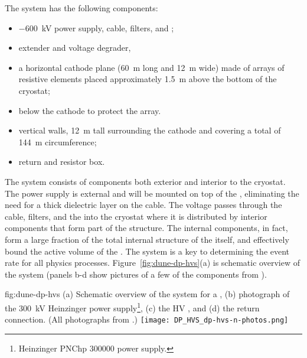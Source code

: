 The \dual {} system has the following components:

\begin{itemize}
\item \SI{-600}{kV}  power supply, cable, filters, and \fdth;
\item {} extender and voltage degrader,
\item a horizontal cathode plane (\SI{60}{\m} long and \SI{12}{\m} wide) made of arrays of resistive elements placed approximately \SI{1.5}{\m} above the bottom of the cryostat;
\item {} below the cathode to protect the  array.
\item vertical  walls, \SI{12}{\m} tall surrounding the cathode and covering a total of \SI{144}{\m} circumference;
\item {} return \fdth and resistor box.
\end{itemize}

The  system consists of components both exterior and interior to the cryostat. The  power supply is external and will be mounted on top of the  \fdth, eliminating the need for a thick dielectric layer on the  cable. 
The voltage passes through the cable, filters, and the \fdth into the cryostat where it is distributed by interior components that form part of the  structure.  The internal  components, in fact, form a large fraction of the total internal structure of the  itself, and  
 effectively bound the active volume of the . The  system is a key to determining the event rate for all  physics processes. 
 Figure~\ref{fig:dune-dp-hvs}(a) is schematic overview of the  system (panels b-d show pictures of a few of the components from ).

\begin{dunefigure}
{fig:dune-dp-hvs}
{(a) Schematic overview of the  system for a \dpmod{}, 
(b) photograph of the \SI{300}{\kV} Heinzinger power supply\footnote{Heinzinger\texttrademark{} PNChp 300000 power supply.}, (c) the HV \fdth{}, and (d) the  return connection. (All photographs from .)}
\texttt{[image: DP\_HVS\_dp-hvs-n-photos.png]}
\end{dunefigure}

